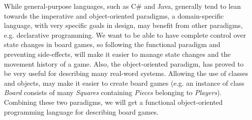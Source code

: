 While general-purpose languages, such as C\# and Java, generally tend to lean
towards the imperative and object-oriented paradigms, a domain-specific
language, with very specific goals in design, may benefit from other paradigms,
e.g. declarative programming. We want to be able to have complete control
over state changes in board games, so following the functional paradigm
and preventing side-effects, will make it easier to manage state changes
and the movement history of a game. Also, the object-oriented paradigm,
has proved to be very useful for describing many real-word systems. Allowing
the use of classes and objects, may make it easier to create board games
(e.g. an instance of class \emph{Board} consists of many \emph{Squares} 
containing \emph{Pieces} belonging to \emph{Players}). Combining these two
paradigms, we will get a functional object-oriented programming language
for describing board games.

